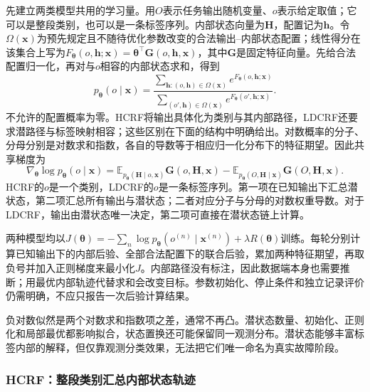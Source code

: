 先建立两类模型共用的学习量。用$O$表示任务输出随机变量、$o$表示给定取值；它可以是整段类别，也可以是一条标签序列。内部状态向量为$\bm H$，配置记为$\bm h$。令$\Omega(\bm x)$为预先规定且不随待优化参数改变的合法输出--内部状态配置；线性得分在该集合上写为$F_{\bm\theta}(o,\bm h;\bm x)=\bm\theta^\top\bm G(o,\bm h,\bm x)$，其中$\bm G$是固定特征向量。先给合法配置归一化，再对与$o$相容的内部状态求和，得到
\begin{equation}
  p_{\bm\theta}(o\mid\bm x)
    =\frac{\sum_{\bm h:(o,\bm h)\in\Omega(\bm x)}
                e^{F_{\bm\theta}(o,\bm h;\bm x)}}
           {\sum_{(o',\bm h)\in\Omega(\bm x)}
                e^{F_{\bm\theta}(o',\bm h;\bm x)}}.
  \label{eq:pgm-dynamic-undirected-hidden-distribution}
\end{equation}
不允许的配置概率为零。HCRF将输出具体化为类别与其内部路径，LDCRF还要求潜路径与标签映射相容；这些区别在下面的结构中明确给出。对数概率的分子、分母分别是对数求和指数，各自的导数等于相应归一化分布下的特征期望。因此共享梯度为
\begin{equation}
  \nabla_{\bm\theta}\log p_{\bm\theta}(o\mid\bm x)
    =\mathbb E_{p_{\bm\theta}(\bm H\mid o,\bm x)}
                        \bm G(o,\bm H,\bm x)
      -\mathbb E_{p_{\bm\theta}(O,\bm H\mid\bm x)}
                        \bm G(O,\bm H,\bm x).
  \label{eq:pgm-dynamic-undirected-hidden-gradient}
\end{equation}
HCRF的$o$是一个类别，LDCRF的$o$是一条标签序列。第一项在已知输出下汇总潜状态，第二项汇总所有输出与潜状态；二者对应分子与分母的对数权重导数。对于LDCRF，输出由潜状态唯一决定，第二项可直接在潜状态链上计算。

两种模型均以$J(\bm\theta)=-\sum_n\log p_{\bm\theta}(o^{(n)}\mid\bm x^{(n)})+\lambda R(\bm\theta)$训练。每轮分别计算已知输出下的内部后验、全部合法配置下的联合后验，累加两种特征期望，再取负号并加入正则梯度来最小化$J$。内部路径没有标注，因此数据端本身也需要推断；用最优内部轨迹代替求和会改变目标。参数初始化、停止条件和独立记录评价仍需明确，不应只报告一次后验计算结果。

负对数似然是两个对数求和指数项之差，通常不再凸。潜状态数量、初始化、正则化和局部最优都影响拟合，状态置换还可能保留同一观测分布。潜状态能够丰富标签内部的解释，但仅靠观测分类效果，无法把它们唯一命名为真实故障阶段。

\subsubsection{HCRF：整段类别汇总内部状态轨迹}
\label{sec:pgm-dynamic-undirected-hcrf-model}

